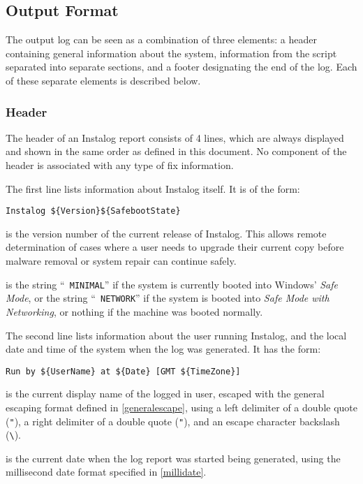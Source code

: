 \subsection{Output Format} \label{sec:section_separator}
The output log can be seen as a combination of three elements: a header
containing general information about the system, information from the script
separated into separate sections, and a footer designating the end of the log. 
Each of these separate elements is described below.

\subsubsection{Header}
The header of an Instalog report consists of 4 lines, which are always displayed
and shown in the same order as defined in this document. No component of the
header is associated with any type of fix information.

The first line lists information about Instalog itself. It is of the form:
\begin{verbatim}
Instalog ${Version}${SafebootState}
\end{verbatim}

 is the version number of the current release of Instalog. This
allows remote determination of cases where a user needs to upgrade their current
copy before malware removal or system repair can continue safely.

 is the string ``\verb| MINIMAL|'' if the system is currently
booted into Windows' \textit{Safe Mode}, or the string ``\verb| NETWORK|'' if
the system is booted into \textit{Safe Mode with Networking}, or nothing if the
machine was booted normally.

The second line lists information about the user running Instalog, and the local
date and time of the system when the log was generated. It has the form:
\begin{verbatim}
Run by ${UserName} at ${Date} [GMT ${TimeZone}]
\end{verbatim}

 is the current display name of the logged in user, escaped with
the general escaping format defined in \ref{generalescape}, using a left
delimiter of a double quote (\verb|"|), a right delimiter of a double
quote (\verb|"|), and an escape character backslash (\verb|\|).

 is the current date when the log report was started being generated,
using the millisecond date format specified in \ref{millidate}.

